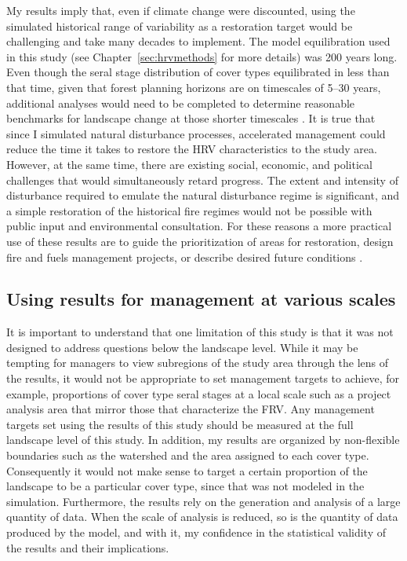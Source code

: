 My results imply that, even if climate change were discounted, using the simulated historical range of variability as a restoration target would be challenging and take many decades to implement. The model equilibration used in this study (see Chapter~\ref{sec:hrvmethods} for more details) was 200 years long. Even though the seral stage distribution of cover types equilibrated in less than that time, given that forest planning horizons are on timescales of 5--30 years, additional analyses would need to be completed to determine reasonable benchmarks for landscape change at those shorter timescales \citep{Millar1999,Millar2014}. It is true that since I simulated natural disturbance processes, accelerated management could reduce the time it takes to restore the HRV characteristics to the study area. However, at the same time, there are existing social, economic, and political challenges that would simultaneously retard progress. The extent and intensity of disturbance required to emulate the natural disturbance regime is significant, and a simple restoration of the historical fire regimes would not be possible with public input and environmental consultation. For these reasons a more practical use of these results are to guide the prioritization of areas for restoration, design fire and fuels management projects, or describe desired future conditions \citep{Keeley2000,Fule2008,Safford2014}.


\subsection{Using results for management at various scales}
It is important to understand that one limitation of this study is that it was not designed to address questions below the landscape level. While it may be tempting for managers to view subregions of the study area through the lens of the results, it would not be appropriate to set management targets to achieve, for example, proportions of cover type seral stages at a local scale such as a project analysis area that mirror those that characterize the FRV. Any management targets set using the results of this study should be measured at the full landscape level of this study. In addition, my results are organized by non-flexible boundaries such as the watershed and the area assigned to each cover type. Consequently it would not make sense to target a certain proportion of the landscape to be a particular cover type, since that was not modeled in the simulation. Furthermore, the results rely on the generation and analysis of a large quantity of data. When the scale of analysis is reduced, so is the quantity of data produced by the model, and with it, my confidence in the statistical validity of the results and their implications. 

